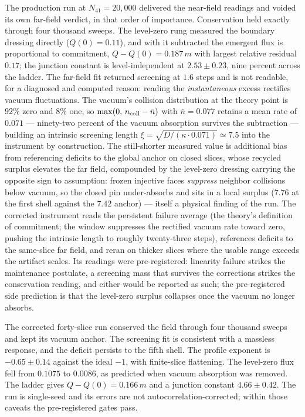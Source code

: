 \documentclass[11pt]{article}
\begin{document}
The production run at $N_{41}=20{,}000$ delivered the near-field readings and voided its own far-field verdict, in that order of importance. Conservation held exactly through four thousand sweeps. The level-zero rung measured the boundary dressing directly ($Q(0)=0.11$), and with it subtracted the emergent flux is proportional to commitment, $Q-Q(0)=0.187\,m$ with largest relative residual $0.17$; the junction constant is level-independent at $2.53\pm0.23$, nine percent across the ladder. The far-field fit returned screening at $1.6$ steps and is not readable, for a diagnosed and computed reason: reading the \emph{instantaneous} excess rectifies vacuum fluctuations. The vacuum's collision distribution at the theory point is $92\%$ zero and $8\%$ one, so $\max(0,\,n_{\rm coll}-\bar n)$ with $\bar n=0.077$ retains a mean rate of $0.071$ --- ninety-two percent of the vacuum absorption survives the subtraction --- building an intrinsic screening length $\xi=\sqrt{D/(\kappa\cdot0.071)}\simeq7.5$ into the instrument by construction. The still-shorter measured value is additional bias from referencing deficits to the global anchor on closed slices, whose recycled surplus elevates the far field, compounded by the level-zero dressing carrying the opposite sign to assumption: frozen injective faces \emph{suppress} neighbor collisions below vacuum, so the closed pin under-absorbs and sits in a local surplus ($7.76$ at the first shell against the $7.42$ anchor) --- itself a physical finding of the run. The corrected instrument reads the persistent failure average (the theory's definition of commitment; the window suppresses the rectified vacuum rate toward zero, pushing the intrinsic length to roughly twenty-three steps), references deficits to the same-slice far field, and reran on thicker slices where the usable range exceeds the artifact scales. Its readings were pre-registered: linearity failure strikes the maintenance postulate, a screening mass that survives the corrections strikes the conservation reading, and either would be reported as such; the pre-registered side prediction is that the level-zero surplus collapses once the vacuum no longer absorbs.

The corrected forty-slice run conserved the field through four thousand sweeps and kept its vacuum anchor. The screening fit is consistent with a massless response, and the deficit persists to the fifth shell. The profile exponent is $-0.65\pm0.14$ against the ideal $-1$, with finite-slice flattening. The level-zero flux fell from $0.1075$ to $0.0086$, as predicted when vacuum absorption was removed. The ladder gives $Q-Q(0)=0.166\,m$ and a junction constant $4.66\pm0.42$. The run is single-seed and its errors are not autocorrelation-corrected; within those caveats the pre-registered gates pass.
\end{document}
